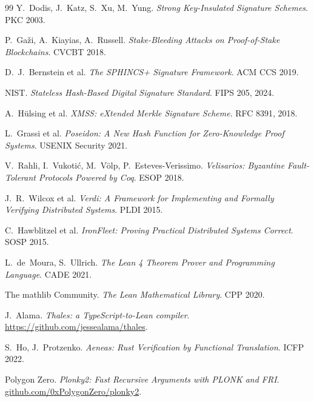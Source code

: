 \documentclass[10pt]{article}
\begin{document}
{\begin{thebibliography}{99}
Y.~Dodis, J.~Katz, S.~Xu, M.~Yung.
\emph{Strong Key-Insulated Signature Schemes}. PKC 2003.

P.~Ga\v{z}i, A.~Kiayias, A.~Russell.
\emph{Stake-Bleeding Attacks on Proof-of-Stake Blockchains}. CVCBT 2018.

D.~J.~Bernstein et al.
\emph{The SPHINCS+ Signature Framework}. ACM CCS 2019.

NIST.
\emph{Stateless Hash-Based Digital Signature Standard}. FIPS 205, 2024.

A.~H\"ulsing et al.
\emph{XMSS: eXtended Merkle Signature Scheme}. RFC 8391, 2018.

L.~Grassi et al.
\emph{Poseidon: A New Hash Function for Zero-Knowledge Proof Systems}.
USENIX Security 2021.

V.~Rahli, I.~Vukoti\'c, M.~V\"olp, P.~Esteves-Verissimo.
\emph{Velisarios: Byzantine Fault-Tolerant Protocols Powered by Coq}.
ESOP 2018.

J.~R.~Wilcox et al.
\emph{Verdi: A Framework for Implementing and Formally Verifying
Distributed Systems}. PLDI 2015.

C.~Hawblitzel et al.
\emph{IronFleet: Proving Practical Distributed Systems Correct}. SOSP
2015.

L.~de~Moura, S.~Ullrich.
\emph{The Lean 4 Theorem Prover and Programming Language}. CADE 2021.

The mathlib Community.
\emph{The Lean Mathematical Library}. CPP 2020.

J.~Alama. \emph{Thales: a TypeScript-to-Lean compiler}.
\url{https://github.com/jessealama/thales}.

S.~Ho, J.~Protzenko. \emph{Aeneas: Rust Verification by Functional
Translation}. ICFP 2022.

Polygon Zero. \emph{Plonky2: Fast Recursive Arguments with PLONK and
FRI}. \url{github.com/0xPolygonZero/plonky2}.

\end{thebibliography}
}
\end{document}
